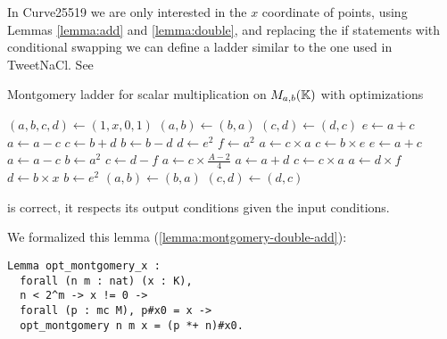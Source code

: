 In Curve25519 we are only interested in the $x$ coordinate of points, using
Lemmas \ref{lemma:add} and \ref{lemma:double}, and replacing the if statements
with conditional swapping we can define a ladder similar to the one used in TweetNaCl.
See 

\begin{algorithm}
\caption{Montgomery ladder for scalar multiplication on $M_{a,b}(\mathbb{K})$ with optimizations}
\label{alg:montgomery-double-add}
\begin{algorithmic}
\STATE $(a,b,c,d) \leftarrow (1,x,0,1)$
    \STATE $(a,b) \leftarrow (b,a)$
    \STATE $(c,d) \leftarrow (d,c)$
  \ENDIF
  \STATE $e \leftarrow a + c$
  \STATE $a \leftarrow a - c$
  \STATE $c \leftarrow b + d$
  \STATE $b \leftarrow b - d$
  \STATE $d \leftarrow e^2$
  \STATE $f \leftarrow a^2$
  \STATE $a \leftarrow c \times a$
  \STATE $c \leftarrow b \times e$
  \STATE $e \leftarrow a + c$
  \STATE $a \leftarrow a - c$
  \STATE $b \leftarrow a^2$
  \STATE $c \leftarrow d-f$
  \STATE $a \leftarrow c\times\frac{A - 2}{4}$
  \STATE $a \leftarrow a + d$
  \STATE $c \leftarrow c \times a$
  \STATE $a \leftarrow d \times f$
  \STATE $d \leftarrow b \times x$
  \STATE $b \leftarrow e^2$
    \STATE $(a,b) \leftarrow (b,a)$
    \STATE $(c,d) \leftarrow (d,c)$
  \ENDIF
\ENDFOR
\end{algorithmic}
\end{algorithm}

\begin{lemma}
\label{lemma:montgomery-double-add}
 is correct, \ie it respects its output
conditions given the input conditions.
\end{lemma}


We formalized this lemma (\ref{lemma:montgomery-double-add}):
\begin{lstlisting}[language=Coq]
Lemma opt_montgomery_x :
  forall (n m : nat) (x : K),
  n < 2^m -> x != 0 ->
  forall (p : mc M), p#x0 = x ->
  opt_montgomery n m x = (p *+ n)#x0.
\end{lstlisting}

